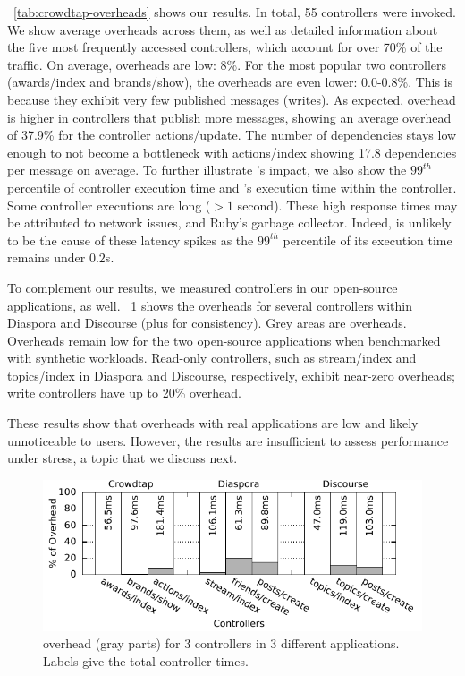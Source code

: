 \F~\ref{tab:crowdtap-overheads} shows our results. In total, 55 controllers
were invoked. We show average overheads across them, as well as detailed
information about the five most frequently accessed controllers, which account
for over 70\% of the traffic. On average, \synapse overheads are low: 8\%.
For the most popular two controllers ({\code awards/index} and {\code
brands/show}), the overheads are even lower: 0.0-0.8\%. This is because they
exhibit very few published messages (writes). As expected, \synapse overhead
is higher in controllers that publish more messages, showing an average overhead
of 37.9\% for the controller {\code actions/update}.
The number of dependencies stays low enough to not become a bottleneck with
{\code actions/index} showing 17.8 dependencies per message on average.
To further illustrate \synapse's impact, we also show the $99^{th}$ percentile
of controller execution time and \synapse's execution time within the controller.
Some controller executions are long ($>1$ second). These high response times may
be attributed to network issues, and Ruby's garbage collector.
Indeed, \synapse is unlikely to be the cause of these latency spikes as the
$99^{th}$ percentile of its execution time remains under $0.2$s.

To complement our \crowdtap results, we measured controllers in our open-source
applications, as well. \F~\ref{fig:app-overheads} shows the \synapse
overheads for several controllers within Diaspora and Discourse (plus
\crowdtap for consistency). Grey areas are \synapse overheads. Overheads
remain low for the two open-source applications when benchmarked with synthetic
workloads. Read-only controllers, such as {\code stream/index} and {\code
topics/index} in Diaspora and Discourse, respectively, exhibit near-zero
overheads; write controllers have up to 20\% overhead.

These results show that \synapse overheads with real applications are low and
likely unnoticeable to users. However, the results are insufficient to assess
performance under stress, a topic that we discuss next.

\begin{figure}[t]
 \centering
 \includegraphics[width=0.8\linewidth]{figures/synapse/overhead-hist.pdf}
 \caption{\synapse overhead (gray parts) for 3 controllers in 3 different
 applications. Labels give the total controller times.}
 \label{fig:app-overheads}
\end{figure}



